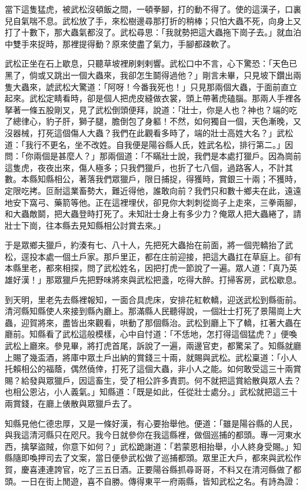 \begin{showcontents}{}
當下這隻猛虎，被武松沒頓飯之間，一頓拳腳，打的動不得了。使的這漢子，口裏兒自氣喘不息。武松放了手，來松樹邊尋那打折的稍棒；只怕大蟲不死，向身上又打了十數下，那大蟲氣都沒了。武松尋思：「我就勢把這大蟲拖下崗子去。」就血泊中雙手來捉時，那裡提得動？原來使盡了氣力，手腳都疎軟了。

武松正坐在石上歇息，只聽草坡裡刷剌剌響。武松口中不言，心下驚恐：「天色已黑了，倘或又跳出一個大蟲來，我卻怎生鬬得過他？」剛言未畢，只見坡下鑽出兩隻大蟲來，諕武松大驚道：「阿呀！今番我死也！」只見那兩個大蟲，于面前直立起來。武松定睛看時，卻是個人把虎皮縫做衣裳，頭上帶著虎磕腦。那兩人手裡各拏著一條五股剛叉，見了武松倒頭便拜，說道：「壯士，你是人也？神也？端的吃了總律心，豹子肝，獅子腿，膽倒包了身軀！不然，如何獨自一個，天色漸晚，又沒器械，打死這個傷人大蟲？我們在此觀看多時了，端的壯士高姓大名？」武松道：「我行不更名，坐不改姓。自我便是陽谷縣人氏，姓武名松，排行第二。」因問：「你兩個是甚麼人？」那兩個道：「不瞞壯士說，我們是本處打獵戶。因為崗前這隻虎，夜夜出來，傷人極多；只我們獵戶，也折了七八個，過路客人，不計其數。本縣知縣相公，著落我們眾獵戶，限日捕捉，得獲時，賞銀三十兩；不獲時，定限吃拷。叵耐這業畜勢大，難近得他，誰敢向前？我們只和數十鄉夫在此，遠遠地安下窩弓、藥箭等他。正在這裡埋伏，卻見你大刺刺從崗子上走來，三拳兩腳，和大蟲敵鬬，把大蟲登時打死了。未知壯士身上有多少力？俺眾人把大蟲綣了，請壯士下崗，往本縣去見知縣相公討賞去來。」

于是眾鄉夫獵戶，約湊有七、八十人，先把死大蟲抬在前面，將一個兜轎抬了武松，逕投本處一個土戶家。那戶里正，都在庄前迎接，把這大蟲扛在草庭上。卻有本縣里老，都來相探，問了武松姓名，因把打虎一節說了一遍。眾人道：「真乃英雄好漢！」那眾獵戶先把野味將來與武松把盞，吃得大醉。打掃客房，武松歇息。

到天明，里老先去縣裡報知，一面合具虎床，安排花紅軟轎，迎送武松到縣衙前。清河縣知縣使人來接到縣內廳上。那滿縣人民聽得說，一個壯士打死了景陽崗上大蟲，迎賀將來，盡皆出來觀看，哄動了那個縣治。武松到廳上下了轎，扛著大蟲在廳前。知縣看了武松這般模樣，心中自忖道：「不恁地，怎打得這個猛虎？」便喚武松上廳來。參見畢，將打虎首尾，訴說了一遍，兩邊官吏，都驚呆了。知縣就廳上賜了幾盃酒，將庫中眾土戶出納的賞錢三十兩，就賜與武松。武松稟道：「小人托賴相公的福蔭，偶然僥倖，打死了這個大蟲，非小人之能。如何敢受這三十兩賞賜？給發與眾獵戶，因這畜生，受了相公許多責罰。何不就把這賞給散與眾人去？也相公恩沾，小人義氣。」知縣道：「既是如此，任從壯士處分。」武松就把這三十兩賞錢，在廳上俵散與眾獵戶去了。

知縣見他仁德忠厚，又是一條好漢，有心要抬舉他。便道：「雖是陽谷縣的人民，與我這清河縣只在咫尺。我今日就參你在我這縣裡，做個巡捕的都頭。專一河東水西，擒拏盜賊，你意下如何？」武松跪謝道：「若蒙恩相抬舉，小人終身受賜。」知縣隨即喚押司去了文案，當日便參武松做了巡捕都頭。眾里正大戶，都來與武松作賀，慶喜連連誇官，吃了三五日酒。正要陽谷縣抓尋哥哥，不料又在清河縣做了都頭。一日在街上閒遊，喜不自勝。傳得東平一府兩縣，皆知武松之名。有詩為證：


\end{showcontents}
